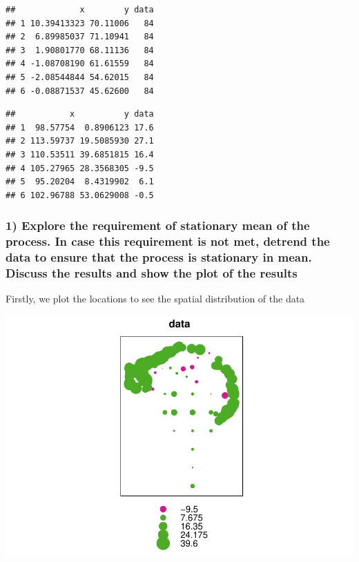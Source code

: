 \documentclass[
]{article}
\begin{document}
\begin{verbatim}
##             x        y data
## 1 10.39413323 70.11006   84
## 2  6.89985037 71.10941   84
## 3  1.90801770 68.11136   84
## 4 -1.08708190 61.61559   84
## 5 -2.08544844 54.62015   84
## 6 -0.08871537 45.62600   84
\end{verbatim}

\begin{verbatim}
##           x          y data
## 1  98.57754  0.8906123 17.6
## 2 113.59737 19.5085930 27.1
## 3 110.53511 39.6851815 16.4
## 4 105.27965 28.3568305 -9.5
## 5  95.20204  8.4319902  6.1
## 6 102.96788 53.0629008 -0.5
\end{verbatim}

\hypertarget{explore-the-requirement-of-stationary-mean-of-the-process.-in-case-this-requirement-is-not-met-detrend-the-data-to-ensure-that-the-process-is-stationary-in-mean.-discuss-the-results-and-show-the-plot-of-the-results}{%
\subsubsection{1) Explore the requirement of stationary mean of the
process. In case this requirement is not met, detrend the data to ensure
that the process is stationary in mean. Discuss the results and show the
plot of the
results}\label{explore-the-requirement-of-stationary-mean-of-the-process.-in-case-this-requirement-is-not-met-detrend-the-data-to-ensure-that-the-process-is-stationary-in-mean.-discuss-the-results-and-show-the-plot-of-the-results}}

Firstly, we plot the locations to see the spatial distribution of the
data

\includegraphics{Assignment_1_files/figure-latex/unnamed-chunk-5-1.pdf}
\end{document}

